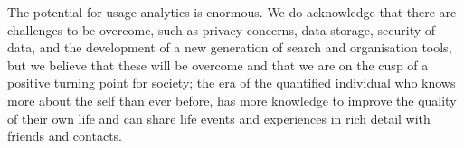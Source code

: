 The potential for usage analytics is enormous. We do acknowledge that there are  challenges to be overcome, such as privacy concerns, data storage, security of data, and the development of a new generation of search and organisation tools, but we believe that these will be overcome and that we are on the cusp of a positive turning point for society; the era of the quantified individual who knows more about the self than ever before, has more knowledge to improve the quality of their own life and can share life events and experiences in rich detail with friends and contacts.